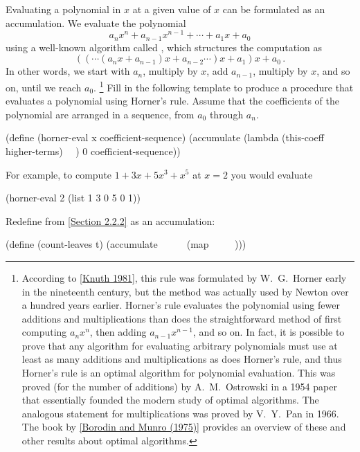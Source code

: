 \begin{exercise}
	\label{Exercise 2.34}
	Evaluating a polynomial in \( x \) at a given value of \( x \) can be formulated as an accumulation.
	We evaluate the polynomial
	\[
		a_n x^n + a_{n-1} x^{n-1} + \dotsb + a_1 x + a_0
	\]
	using a well-known algorithm called , which structures
	the computation as
	\[
		(( \dotsm (a_n x + a_{n - 1}) x + a_{n - 2} \dotsm )x + a_1) x + a_0 \,.
	\]
	In other words, we start with \( a_n \), multiply by \( x \), add \( a_{n-1} \), multiply by \( x \), and so on, until we reach \( a_0 \).%
	\footnote{
		According to \cref{Knuth 1981}, this rule was formulated by W.~G.~Horner early in the nineteenth century, but the method was actually used by Newton over a hundred years earlier.
		Horner’s rule evaluates the polynomial using fewer additions and multiplications than does the straightforward method of first computing \( a_n x^n \), then adding \( a_{n-1} x^{n-1} \), and so on.
		In fact, it is possible to prove that any algorithm for evaluating arbitrary polynomials must use at least as many additions and multiplications as does Horner’s rule, and thus Horner’s rule is an optimal algorithm for polynomial evaluation.
		This was proved (for the number of additions) by A.~M.~Ostrowski in a 1954 paper that essentially founded the modern study of optimal algorithms.
		The analogous statement for multiplications was proved by V.~Y.~Pan in 1966.
		The book by \cref{Borodin and Munro (1975)} provides an overview of these and other results about optimal algorithms.
	}
	Fill in the following template to produce a procedure that evaluates a polynomial using Horner’s rule.
	Assume that the coefficients of the polynomial are arranged in a sequence, from \( a_0 \) through \( a_n \).
	\begin{scheme}
	  (define (horner-eval x coefficient-sequence)
	    (accumulate (lambda (this-coeff higher-terms) ~~)
	                0
	                coefficient-sequence))
	\end{scheme}
	For example, to compute \( 1 + 3 x + 5 x^3 + x^5 \) at \( x = 2 \) you would evaluate
	\begin{scheme}
	  (horner-eval 2 (list 1 3 0 5 0 1))
	\end{scheme}
\end{exercise}



\begin{exercise}
	\label{Exercise 2.35}
	Redefine  from \cref{Section 2.2.2} as an accumulation:
	\begin{scheme}
	  (define (count-leaves t)
	    (accumulate ~~ ~~ (map ~~ ~~)))
	\end{scheme}
\end{exercise}



